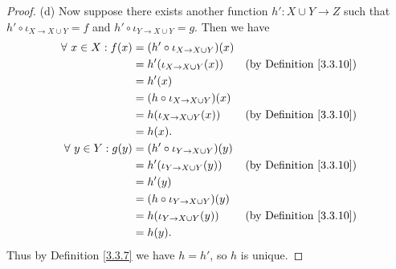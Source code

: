 \begin{proof}{(d)}
    Now suppose there exists another function \(h' : X \cup Y \to Z\) such that \(h' \circ \iota_{X \to X \cup Y} = f\) and \(h' \circ \iota_{Y \to X \cup Y} = g\).
    Then we have
    \begin{align*}
        \forall\ x \in X : f(x) & = (h' \circ \iota_{X \to X \cup Y})(x)                                       \\
                                & = h'(\iota_{X \to X \cup Y}(x))        & \text{(by Definition \ref{3.3.10})} \\
                                & = h'(x)                                                                      \\
                                & = (h \circ \iota_{X \to X \cup Y})(x)                                        \\
                                & = h(\iota_{X \to X \cup Y}(x))         & \text{(by Definition \ref{3.3.10})} \\
                                & = h(x).                                                                      \\
        \forall\ y \in Y : g(y) & = (h' \circ \iota_{Y \to X \cup Y})(y)                                       \\
                                & = h'(\iota_{Y \to X \cup Y}(y))        & \text{(by Definition \ref{3.3.10})} \\
                                & = h'(y)                                                                      \\
                                & = (h \circ \iota_{Y \to X \cup Y})(y)                                        \\
                                & = h(\iota_{Y \to X \cup Y}(y))         & \text{(by Definition \ref{3.3.10})} \\
                                & = h(y).
    \end{align*}
    Thus by Definition \ref{3.3.7} we have \(h = h'\), so \(h\) is unique.
\end{proof}